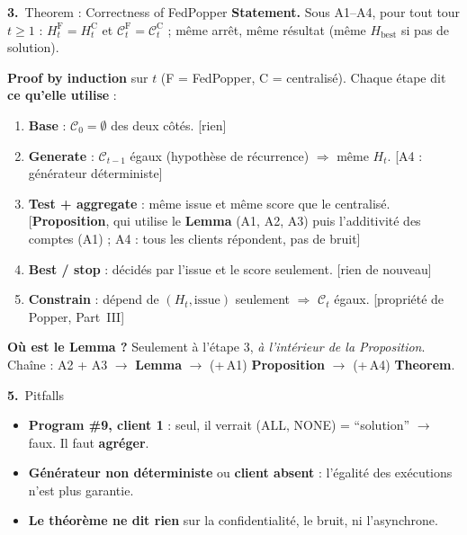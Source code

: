 \documentclass[10pt]{article}
\newcommand{\num}[1]{\textcolor{marine}{\textbf{#1.}}~}
\begin{document}
\begin{minipage}[t]{0.495\textwidth}
\begin{bloc}[fontupper=\scriptsize\raggedright]{\num{3}Theorem : Correctness of FedPopper}
\textbf{Statement.} Sous A1--A4, pour tout tour $t\ge1$ : $H_t^{\mathrm F}=H_t^{\mathrm C}$ et $\mathcal{C}_t^{\mathrm F}=\mathcal{C}_t^{\mathrm C}$ ; même arrêt, même résultat (même $H_{\text{best}}$ si pas de solution).\par\vspace{2pt}
\textbf{Proof by induction} sur $t$ (F = FedPopper, C = centralisé). Chaque étape dit \textcolor{marine}{\textbf{ce qu'elle utilise}} :
\begin{enumerate}[leftmargin=12pt, itemsep=0pt, topsep=1pt]
  \item \textbf{Base} : $\mathcal{C}_0=\emptyset$ des deux côtés. \textcolor{marine}{[rien]}
  \item \textbf{Generate} : $\mathcal{C}_{t-1}$ égaux (hypothèse de récurrence) $\Rightarrow$ même $H_t$. \textcolor{marine}{[A4 : générateur déterministe]}
  \item \textbf{Test + aggregate} : même issue et même score que le centralisé. \textcolor{marine}{[\textbf{Proposition}, qui utilise le \textbf{Lemma} (A1, A2, A3) puis l'additivité des comptes (A1) ; A4 : tous les clients répondent, pas de bruit]}
  \item \textbf{Best / stop} : décidés par l'issue et le score seulement. \textcolor{marine}{[rien de nouveau]}
  \item \textbf{Constrain} : dépend de $(H_t,\text{issue})$ seulement $\Rightarrow$ $\mathcal{C}_t$ égaux. \textcolor{marine}{[propriété de Popper, Part~III]}
\end{enumerate}
\begin{astuce}
\textbf{Où est le Lemma ?} Seulement à l'étape 3, \emph{à l'intérieur de la Proposition}. Chaîne : A2 + A3 $\to$ \textbf{Lemma} $\to$ (+\,A1) \textbf{Proposition} $\to$ (+\,A4) \textbf{Theorem}.
\end{astuce}
\end{bloc}
\vspace{2pt}
\begin{bloc}[fontupper=\scriptsize\raggedright]{\num{5}Pitfalls}
\begin{itemize}
  \item \textbf{Program \#9, client 1} : seul, il verrait (ALL, NONE) = ``solution'' $\to$ faux. Il faut \textbf{agréger}.
  \item \textbf{Générateur non déterministe} ou \textbf{client absent} : l'égalité des exécutions n'est plus garantie.
  \item \textbf{Le théorème ne dit rien} sur la confidentialité, le bruit, ni l'asynchrone.
\end{itemize}
\end{bloc}
\end{minipage}
\end{document}
